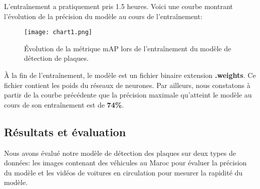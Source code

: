     L’entraînement a pratiquement pris 1.5 heures. Voici une courbe montrant l’évolution de la précision du modèle au cours de l’entraînement:
    \begin{figure}[H]
        \centering
        \texttt{[image: chart1.png]}
        \caption{Évolution de la métrique mAP lors de l'entraînement du modèle de détection de plaques.}
    \end{figure}
    À la fin de l'entraînement, le modèle est un fichier binaire extension \textbf{.weights}. Ce fichier contient les poids du réseaux de neurones. Par ailleurs, nous constatons à partir de la courbe précédente que la précision maximale qu'atteint le modèle au cours de son entraînement est de \textbf{74\%}.
    \subsection{Résultats et évaluation}
    Nous avons évalué notre modèle de détection des plaques sur deux types de données: les images contenant des véhicules au Maroc pour évaluer la précision du modèle et les vidéos de voitures en circulation pour mesurer la rapidité du modèle. 
    
